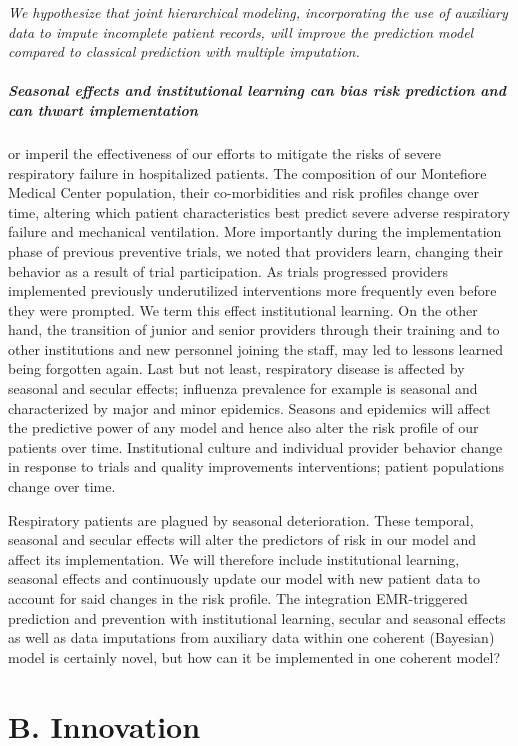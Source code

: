 \documentclass[11pt,notitlepage]{article}
\begin{document}
\emph{We hypothesize that joint hierarchical modeling, incorporating the use of auxiliary data to impute incomplete patient records, will improve the prediction model compared to classical prediction with multiple imputation.}

\subparagraph*{Seasonal effects and institutional learning can bias risk prediction and can thwart implementation} or imperil the effectiveness of our efforts to mitigate the risks of severe respiratory failure in hospitalized patients. The composition of our Montefiore Medical Center population, their co-morbidities and risk profiles change over time, altering which patient characteristics best predict severe adverse respiratory failure and mechanical ventilation. More importantly  during the implementation phase of previous preventive trials, we noted that providers learn, changing their behavior as a result of trial participation. As trials progressed providers implemented previously underutilized interventions more frequently even before they were prompted. We term this effect institutional learning. On the other hand, the transition of junior and senior providers through their training and to other institutions and new personnel joining the staff, may led to lessons learned being forgotten again. Last but not least, respiratory disease is affected by seasonal and secular effects; influenza prevalence for example is seasonal and characterized by major and minor epidemics. Seasons and epidemics will affect the predictive power of any model and hence also alter the risk profile of our patients over time. Institutional culture and individual provider behavior change in response to trials and quality improvements interventions; patient populations change over time. 

Respiratory patients are plagued by seasonal deterioration. These temporal, seasonal and secular effects will alter the predictors of risk in our model and affect its implementation. We will therefore include institutional learning, seasonal effects and continuously update our model with new patient data to account for said changes in the risk profile. The integration EMR-triggered prediction and prevention with  institutional learning, secular and seasonal effects as well as data imputations from auxiliary data within one coherent (Bayesian) model is certainly novel, but how can it be implemented in one coherent model? 

\section*{B. Innovation}
\end{document}

